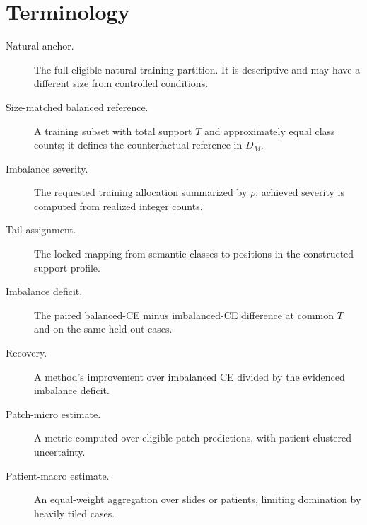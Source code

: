 \documentclass[11pt]{article}
\begin{document}
\section{Terminology}
\begin{description}
  \item[Natural anchor.] The full eligible natural training partition. It is descriptive and may have a different size from controlled conditions.
  \item[Size-matched balanced reference.] A training subset with total support $T$ and approximately equal class counts; it defines the counterfactual reference in $D_M$.
  \item[Imbalance severity.] The requested training allocation summarized by $\rho$; achieved severity is computed from realized integer counts.
  \item[Tail assignment.] The locked mapping from semantic classes to positions in the constructed support profile.
  \item[Imbalance deficit.] The paired balanced-CE minus imbalanced-CE difference at common $T$ and on the same held-out cases.
  \item[Recovery.] A method's improvement over imbalanced CE divided by the evidenced imbalance deficit.
  \item[Patch-micro estimate.] A metric computed over eligible patch predictions, with patient-clustered uncertainty.
  \item[Patient-macro estimate.] An equal-weight aggregation over slides or patients, limiting domination by heavily tiled cases.
\end{description}

\clearpage


\end{document}
